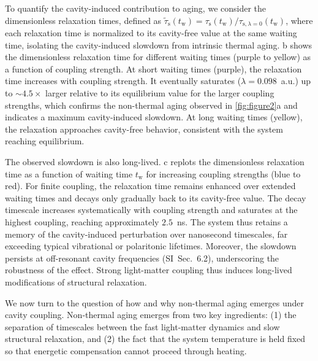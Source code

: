 \documentclass[aps, prl,
 reprint,
 superscriptaddress,
 citeautoscript,
 amsmath,amssymb,
 tightenlines
]{revtex4-2}
\begin{document}
To quantify the cavity-induced contribution to aging, we consider the dimensionless relaxation times, defined as $\tilde{\tau}_\mathrm{s}(t_\mathrm{w}) = \tau_\mathrm{s}(t_\mathrm{w}) / \tau_{\mathrm{s},\lambda=0}(t_\mathrm{w})$, where each relaxation time is normalized to its cavity-free value at the same waiting time, isolating the cavity-induced slowdown from intrinsic thermal aging. b shows the dimensionless relaxation time for different waiting times (purple to yellow) as a function of coupling strength. At short waiting times (purple), the relaxation time increases with coupling strength. It eventually saturates ($\lambda = 0.098$~a.u.)  up to $\sim 4.5\times$ larger relative to its equilibrium value for the larger coupling strengths, which confirms the non-thermal aging observed in \cref{fig:figure2}a and indicates a maximum cavity-induced slowdown. At long waiting times (yellow), the relaxation approaches cavity-free behavior, consistent with the system reaching equilibrium.

The observed slowdown is also long-lived. c replots the dimensionless relaxation time as a function of waiting time $t_\mathrm{w}$ for increasing coupling strengths (blue to red). For finite coupling, the relaxation time remains enhanced over extended waiting times and decays only gradually back to its cavity-free value. The decay timescale increases systematically with coupling strength and saturates at the highest coupling, reaching approximately $2.5$~ns. The system thus retains a memory of the cavity-induced perturbation over nanosecond timescales, far exceeding typical vibrational or polaritonic lifetimes.\cite{dunkelberger2016modified} 
Moreover, the slowdown persists at off-resonant cavity frequencies (SI~Sec.~6.2), underscoring the robustness of the effect.
Strong light-matter coupling thus induces long-lived modifications of structural relaxation.

We now turn to the question of how and why non-thermal aging emerges under cavity coupling. 
Non-thermal aging emerges from two key ingredients: (1) the separation of timescales between the fast light-matter dynamics and slow structural relaxation, and (2) the fact that the system temperature is held fixed so that energetic compensation cannot proceed through heating. 
\end{document}
